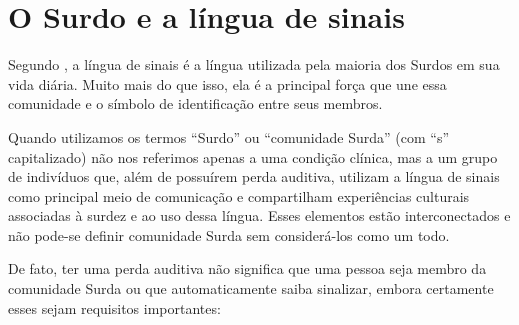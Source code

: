 \section{O Surdo e a língua de sinais}
\label{sec:lingua-sinais}

Segundo , a língua de sinais é a língua utilizada pela maioria dos Surdos em sua vida diária. Muito mais do que isso, ela é a principal força que une essa comunidade e o símbolo de identificação entre seus membros.



Quando utilizamos os termos ``Surdo'' ou ``comunidade Surda'' (com ``s'' capitalizado) não nos referimos apenas a uma condição clínica, mas a um grupo de indivíduos que, além de possuírem perda auditiva, utilizam a língua de sinais como principal meio de comunicação e compartilham experiências culturais associadas à surdez e ao uso dessa língua. Esses elementos estão interconectados e não pode-se definir comunidade Surda sem considerá-los como um todo.

De fato, ter uma perda auditiva não significa que uma pessoa seja membro da comunidade Surda ou que automaticamente saiba sinalizar, embora certamente esses sejam requisitos importantes:



